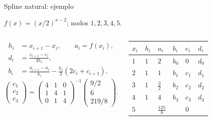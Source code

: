 \documentclass[original_version/main.tex]{subfiles}
\begin{document}
\begin{frame}[t]{Spline natural: ejemplo}
\par\noindent\begin{minipage}[t][9mm][t]{\textwidth}\small\strut $f(x)=(x/2)^{x-2}$; nodos $1,2,3,4,5$.\end{minipage}\par\nointerlineskip
\begin{columns}[T]\scriptsize\begin{align*}
h_i&=x_{i+1}-x_i,\qquad a_i=f(x_i),\\
d_i&=\frac{c_{i+1}-c_i}{3h_i},\\
b_i&=\frac{a_{i+1}-a_i}{h_i}-\frac{h_i}{3}(2c_i+c_{i+1}).
\end{align*}\scriptsize\[\begin{pmatrix}c_1\\c_2\\c_3\end{pmatrix}=\begin{pmatrix}4&1&0\\1&4&1\\0&1&4\end{pmatrix}^{-1}\begin{pmatrix}9/2\\6\\219/8\end{pmatrix}.\]\begin{minipage}[t]{\textwidth}\begingroup\scriptsize\setlength{\tabcolsep}{2pt}\begin{center}\begin{tabular}{|C{.12\textwidth}|C{.12\textwidth}|C{.12\textwidth}|C{.12\textwidth}|C{.12\textwidth}|C{.12\textwidth}|}\hline
\rule[-2mm]{0pt}{6mm}$x_i$&$h_i$&$a_i$&$b_i$&$c_i$&$d_i$\\\hline
\rule[-2.5mm]{0pt}{7mm}$1$&$1$&$2$&$b_0$&$0$&$d_0$\\\hline
\rule[-2.5mm]{0pt}{7mm}$2$&$1$&$1$&$b_1$&$c_1$&$d_1$\\\hline
\rule[-2.5mm]{0pt}{7mm}$3$&$1$&$\frac{3}{2}$&$b_2$&$c_2$&$d_2$\\\hline
\rule[-2.5mm]{0pt}{7mm}$4$&$1$&$4$&$b_3$&$c_3$&$d_3$\\\hline
\rule[-2.5mm]{0pt}{7mm}$5$&&$\frac{125}{8}$&&$0$&\\\hline
\end{tabular}\end{center}\endgroup\end{minipage}\par
\end{columns}
\end{frame}
\end{document}
